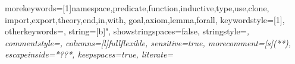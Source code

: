 
\newcommand{\todo}[1]{{\Huge\bfseries TODO: #1}}

\newcommand{\why}{\textsf{Why3}\xspace}
\newcommand{\whyml}{\textsf{Why3ML}\xspace}
\newcommand{\eg}{\emph{e.g.}\xspace}

\newcommand{\keyword}[1]{\texttt{#1}}
\newcommand{\indextt}[1]{\index{#1@\protect\keyword{#1}}}
\newcommand{\indexttbs}[1]{\index{#1@\protect\keywordbs{#1}}}
\newif\ifspace
\newif\ifnewentry
\newcommand{\addspace}{\ifspace ~ \spacefalse \fi}
\newcommand{\term}[2]{\addspace\hbox{\lstinline|#1|%
\ifthenelse{\equal{#2}{}}{}{\indexttbase{#2}{#1}}}\spacetrue}
\newcommand{\nonterm}[2]{%
  \ifthenelse{\equal{#2}{}}%
             {\addspace\hbox{\textsl{#1}\ifnewentry\index{#1@\textsl{#1}}\fi}\spacetrue}%
             {\addspace\hbox{\textsl{#1}\footnote{#2}\ifnewentry\index{grammar entries!\textsl{#1}}\fi}\spacetrue}}
\newcommand{\repetstar}{$^*$\spacetrue}
\newcommand{\repetplus}{$^+$\spacetrue}
\newcommand{\repetone}{$^?$\spacetrue}
\newcommand{\lparen}{\addspace(}
\newcommand{\rparen}{)}
\newcommand{\orelse}{\addspace$\mid$\spacetrue}
\newcommand{\sep}{ \\[2mm] \spacefalse\newentrytrue}
\newcommand{\newl}{ \\ & & \spacefalse}
\newcommand{\alt}{ \\ & $\mid$ & \spacefalse}
\newcommand{\is}{ & $::=$ & \newentryfalse}
\newenvironment{syntax}{\begin{tabular}{@{}rrll@{}}\spacefalse\newentrytrue}{\end{tabular}}
\newcommand{\synt}[1]{$\spacefalse#1$}
\newcommand{\emptystring}{$\epsilon$}
\newcommand{\below}{See\; below}


\RequirePackage{listings}
\RequirePackage{amssymb}


{
morekeywords=[1]{namespace,predicate,function,inductive,type,use,clone,%
import,export,theory,end,in,with,%
goal,axiom,lemma,forall},%
keywordstyle=[1]{\color{blue}},%
otherkeywords={},%
string=[b]",%
showstringspaces=false,%
stringstyle=\itshape,%
commentstyle=\itshape,%
columns=[l]fullflexible,%
sensitive=true,%
morecomment=[s]{(*}{*)},%
escapeinside={*?}{?*},%
keepspaces=true,
literate=%
%
%
}

\lstset{language=why3}


